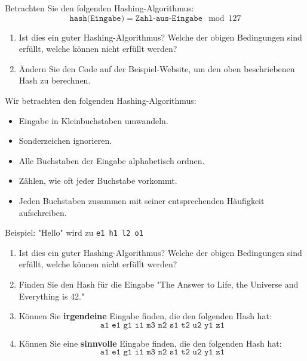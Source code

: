\documentclass[11pt,a4paper]{report}
\begin{document}
\begin{ex}
Betrachten Sie den folgenden Hashing-Algorithmus:
\[
\texttt{hash(Eingabe)} = \texttt{Zahl-aus-Eingabe} \mod 127
\]
\begin{enumerate}
\item Ist dies ein guter Hashing-Algorithmus?
Welche der obigen Bedingungen sind erfüllt, welche können nicht erfüllt werden?
\item Ändern Sie den Code auf der Beispiel-Website, um den oben beschriebenen Hash zu berechnen.
\end{enumerate}
\end{ex}

\begin{ex}
Wir betrachten den folgenden Hashing-Algorithmus:
\begin{itemize}
\item Eingabe in Kleinbuchstaben umwandeln.
\item Sonderzeichen ignorieren.
\item Alle Buchstaben der Eingabe alphabetisch ordnen.
\item Zählen, wie oft jeder Buchstabe vorkommt.
\item Jeden Buchstaben zusammen mit seiner entsprechenden Häufigkeit aufschreiben.
\end{itemize}
Beispiel: "Hello" wird zu \texttt{e1 h1 l2 o1}
\begin{enumerate}
\item Ist dies ein guter Hashing-Algorithmus?
Welche der obigen Bedingungen sind erfüllt, welche können nicht erfüllt werden?
\item Finden Sie den Hash für die Eingabe "The Answer to Life, the Universe and Everything is 42."
\item Können Sie {\bf irgendeine} Eingabe finden, die den folgenden Hash hat:
\[
\texttt{a1 e1 g1 i1 m3 n2 s1 t2 u2 y1 z1}
\]
\item Können Sie eine {\bf sinnvolle} Eingabe finden, die den folgenden Hash hat:
\[
\texttt{a1 e1 g1 i1 m3 n2 s1 t2 u2 y1 z1}
\]
\end{enumerate}
\end{ex}
\end{document}
